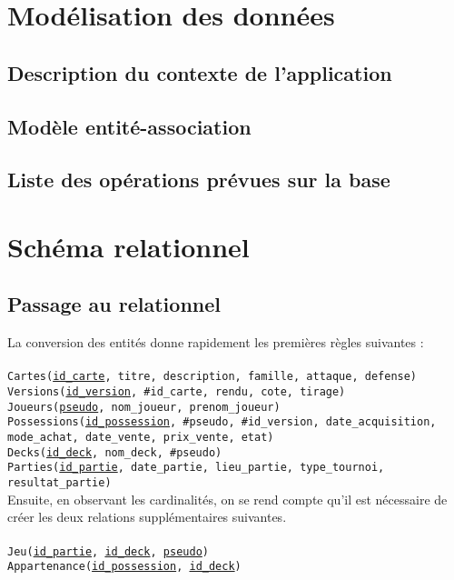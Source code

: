 \documentclass{article}
\begin{document}
\section{Modélisation des données}
\subsection{Description du contexte de l'application}
\subsection{Modèle entité-association}
\subsection{Liste des opérations prévues sur la base}

\section{Schéma relationnel}
\subsection{Passage au relationnel}

La conversion des entités donne rapidement les premières règles suivantes :\\
\\
\texttt{Cartes(\underline{id\_carte}, titre, description, famille, attaque, defense)} \\
\texttt{Versions(\underline{id\_version}, \#id\_carte, rendu, cote, tirage)} \\
\texttt{Joueurs(\underline{pseudo}, nom\_joueur, prenom\_joueur)} \\
\texttt{Possessions(\underline{id\_possession}, \#pseudo, \#id\_version, date\_acquisition, mode\_achat, date\_vente, prix\_vente, etat)} \\
\texttt{Decks(\underline{id\_deck}, nom\_deck, \#pseudo)} \\
\texttt{Parties(\underline{id\_partie}, date\_partie, lieu\_partie, type\_tournoi, resultat\_partie)} \\

Ensuite, en observant les cardinalités, on se rend compte qu'il est nécessaire de créer les deux relations supplémentaires suivantes. \\
\\
\texttt{Jeu(\underline{id\_partie}, \underline{id\_deck}, \underline{pseudo})} \\
\texttt{Appartenance(\underline{id\_possession}, \underline{id\_deck})} \\
\end{document}
